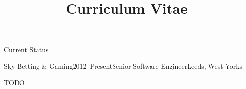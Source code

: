 \documentclass{cv}
\title{Curriculum Vitae}
\begin{document}

\begin{rSection}{Current Status}

\begin{rSubsection}{Sky Betting \& Gaming}{2012--Present}{Senior Software Engineer}{Leeds, West Yorks}
\item TODO
\end{rSubsection}

\end{rSection}

\end{document}
